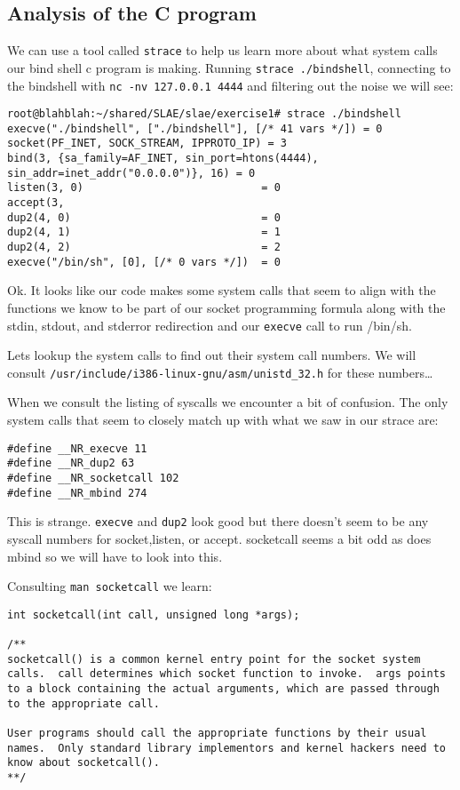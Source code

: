 \documentclass[11pt]{article}
\begin{document}
\subsection{Analysis of the C program}
\label{sec-1-4}

We can use a tool called \verb~strace~ to help us learn more about what system calls
our bind shell c program is making. Running \verb~strace ./bindshell~, connecting
to the bindshell with \verb~nc -nv 127.0.0.1 4444~ and filtering out the noise
we will see:

\begin{verbatim}
root@blahblah:~/shared/SLAE/slae/exercise1# strace ./bindshell
execve("./bindshell", ["./bindshell"], [/* 41 vars */]) = 0
socket(PF_INET, SOCK_STREAM, IPPROTO_IP) = 3
bind(3, {sa_family=AF_INET, sin_port=htons(4444), sin_addr=inet_addr("0.0.0.0")}, 16) = 0
listen(3, 0)                            = 0
accept(3,
dup2(4, 0)                              = 0
dup2(4, 1)                              = 1
dup2(4, 2)                              = 2
execve("/bin/sh", [0], [/* 0 vars */])  = 0
\end{verbatim}

Ok. It looks like our code makes some system calls that seem to align with the
functions we know to be part of our socket programming formula along with the
stdin, stdout, and stderror redirection and our \verb~execve~ call to run /bin/sh.

Lets lookup the system calls to find out their system call numbers. We will
consult \verb~/usr/include/i386-linux-gnu/asm/unistd_32.h~ for these numbers\ldots{}

When we consult the listing of syscalls we encounter a bit of confusion. The
only system calls that seem to closely match up with what we saw in our strace
are:

\begin{verbatim}
#define __NR_execve 11
#define __NR_dup2 63
#define __NR_socketcall 102
#define __NR_mbind 274
\end{verbatim}

This is strange. \verb~execve~ and \verb~dup2~ look good but there doesn't seem to be
any syscall numbers for socket,listen, or accept. socketcall seems a bit odd
as does mbind so we will have to look into this.

Consulting \verb~man socketcall~ we learn:

\begin{verbatim}
int socketcall(int call, unsigned long *args);

/**
socketcall() is a common kernel entry point for the socket system
calls.  call determines which socket function to invoke.  args points
to a block containing the actual arguments, which are passed through
to the appropriate call.

User programs should call the appropriate functions by their usual
names.  Only standard library implementors and kernel hackers need to
know about socketcall().
**/
\end{verbatim}
\end{document}
